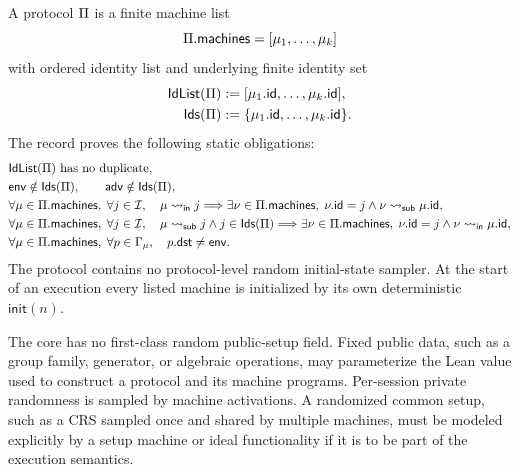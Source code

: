 \begin{definition}[Protocols]
\label{def:uc-protocol}
\leanok
A protocol \(\Pi\) is a finite machine list
\[
  \Pi.\mathsf{machines}=[\mu_1,\ldots,\mu_k]
\]
with ordered identity list and underlying finite identity set
\[
\begin{aligned}
  \mathsf{IdList}(\Pi)&:=[\mu_1.\mathsf{id},\ldots,\mu_k.\mathsf{id}],\\
  \mathsf{Ids}(\Pi)&:=\{\mu_1.\mathsf{id},\ldots,\mu_k.\mathsf{id}\}.
\end{aligned}
\]
The record proves the following static obligations:
\[
\begin{aligned}
  &\mathsf{IdList}(\Pi)\text{ has no duplicate},\\
  &\mathsf{env}\notin\mathsf{Ids}(\Pi),
   \qquad \mathsf{adv}\notin\mathsf{Ids}(\Pi),\\
  &\forall\mu\in\Pi.\mathsf{machines},\;\forall j\in\mathcal{I},\quad
    \mu\leadsto_{\mathsf{in}}j
    \Longrightarrow
    \exists\nu\in\Pi.\mathsf{machines},\;
      \nu.\mathsf{id}=j
      \land\nu\leadsto_{\mathsf{sub}}\mu.\mathsf{id},\\
  &\forall\mu\in\Pi.\mathsf{machines},\;\forall j\in\mathcal{I},\quad
    \mu\leadsto_{\mathsf{sub}}j\land j\in\mathsf{Ids}(\Pi)
    \Longrightarrow
    \exists\nu\in\Pi.\mathsf{machines},\;
      \nu.\mathsf{id}=j
      \land\nu\leadsto_{\mathsf{in}}\mu.\mathsf{id},\\
  &\forall\mu\in\Pi.\mathsf{machines},\;\forall p\in\Gamma_\mu,
    \quad p.\mathsf{dst}\ne\mathsf{env}.
\end{aligned}
\]
The protocol contains no protocol-level random initial-state sampler.  At the
start of an execution every listed machine is initialized by its own
deterministic \(\mathsf{init}(n)\).
\end{definition}

\begin{remark}
\label{rem:uc-public-setup}
The core has no first-class random public-setup field.  Fixed public data, such
as a group family, generator, or algebraic operations, may parameterize the
Lean value used to construct a protocol and its machine programs.  Per-session
private randomness is sampled by machine activations.  A randomized common
setup, such as a CRS sampled once and shared by multiple machines, must be
modeled explicitly by a setup machine or ideal functionality if it is to be
part of the execution semantics.
\end{remark}


